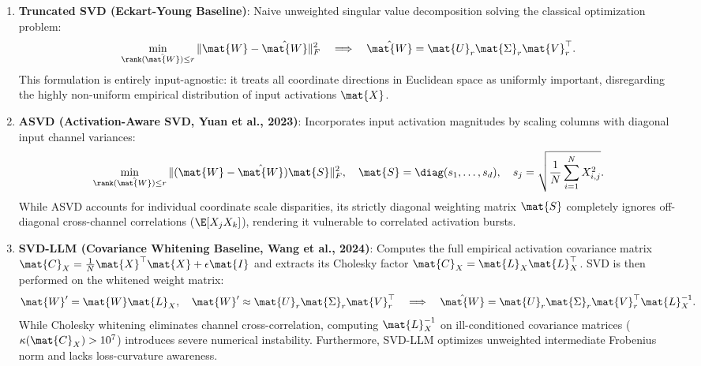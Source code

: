 \begin{enumerate}
    \item \textbf{Truncated SVD (Eckart-Young Baseline)}: Naive unweighted singular value decomposition solving the classical optimization problem:
    \begin{equation}
    \min_{\rank(\hat{\mat{W}}) \le r} \|\mat{W} - \hat{\mat{W}}\|_F^2 \quad \Longrightarrow \quad \hat{\mat{W}} = \mat{U}_r \mat{\Sigma}_r \mat{V}_r^\top.
    \end{equation}
    This formulation is entirely input-agnostic: it treats all coordinate directions in Euclidean space as uniformly important, disregarding the highly non-uniform empirical distribution of input activations $\mat{X}$.
    
    \item \textbf{ASVD (Activation-Aware SVD, Yuan et al., 2023)}: Incorporates input activation magnitudes by scaling columns with diagonal input channel variances:
    \begin{equation}
    \min_{\rank(\hat{\mat{W}}) \le r} \|(\mat{W} - \hat{\mat{W}}) \mat{S}\|_F^2, \quad \mat{S} = \diag(s_1, \dots, s_d), \quad s_j = \sqrt{\frac{1}{N} \sum_{i=1}^N X_{i,j}^2}.
    \end{equation}
    While ASVD accounts for individual coordinate scale disparities, its strictly diagonal weighting matrix $\mat{S}$ completely ignores off-diagonal cross-channel correlations ($\E[X_j X_k]$), rendering it vulnerable to correlated activation bursts.
    
    \item \textbf{SVD-LLM (Covariance Whitening Baseline, Wang et al., 2024)}: Computes the full empirical activation covariance matrix $\mat{C}_X = \frac{1}{N} \mat{X}^\top \mat{X} + \epsilon \mat{I}$ and extracts its Cholesky factor $\mat{C}_X = \mat{L}_X \mat{L}_X^\top$. SVD is then performed on the whitened weight matrix:
    \begin{equation}
    \mat{W}' = \mat{W} \mat{L}_X, \quad \mat{W}' \approx \mat{U}_r \mat{\Sigma}_r \mat{V}_r^\top \quad \Longrightarrow \quad \hat{\mat{W}} = \mat{U}_r \mat{\Sigma}_r \mat{V}_r^\top \mat{L}_X^{-1}.
    \end{equation}
    While Cholesky whitening eliminates channel cross-correlation, computing $\mat{L}_X^{-1}$ on ill-conditioned covariance matrices ($\kappa(\mat{C}_X) > 10^7$) introduces severe numerical instability. Furthermore, SVD-LLM optimizes unweighted intermediate Frobenius norm and lacks loss-curvature awareness.
    

\end{enumerate}
